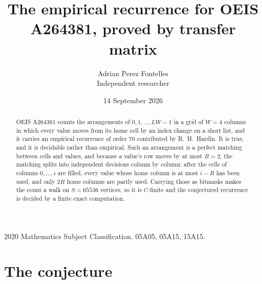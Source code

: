 \documentclass[11pt,a4paper]{article}
\title{The empirical recurrence for OEIS A264381, proved by transfer matrix}
\author{Adrian Perez Fontelles\\ \small Independent researcher}
\date{14 September 2026}
\theoremstyle{plain}
\theoremstyle{definition}
\begin{document}
\maketitle

\begin{abstract}
OEIS A264381 counts the arrangements of $0,1,\dots,LW-1$ in a grid of $W=4$ columns in which
every value moves from its home cell by an index change on a short list, and it carries an
empirical recurrence of order $70$ contributed by R.~H.~Hardin. It is true, and it is
decidable rather than empirical. Such an arrangement is a perfect matching between cells and
values, and because a value's row moves by at most $R=2$, the matching splits into
independent decisions column by column: after the cells of columns $0,\dots,i$ are filled,
every value whose home column is at most $i-R$ has been used, and only $2R$ home columns are
partly used. Carrying those as bitmasks makes the count a walk on $S=65536$ vertices, so it is
$C$-finite and the conjectured recurrence is decided by a finite exact computation.
\end{abstract}

\noindent\small 2020 Mathematics Subject Classification. 05A05, 05A15, 15A15.\normalsize

\section{The conjecture}
\end{document}
